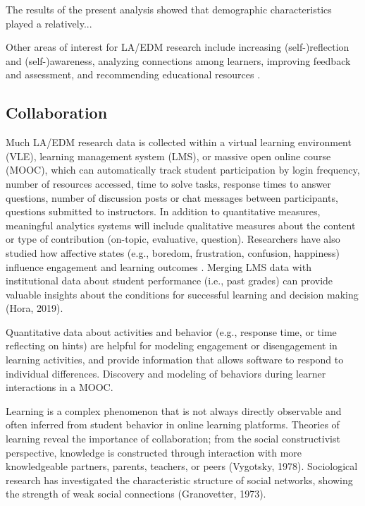 \documentclass[sigconf]{acmart}
\begin{document}
The results of the present analysis showed that demographic 
characteristics played a relatively...  

Other areas of interest for LA/EDM research include 
increasing (self-)reflection and (self-)awareness, analyzing connections among 
learners, improving feedback and assessment, and recommending educational 
resources \cite{lang17, lester19, papamitsiou14}.




\subsection{Collaboration}

Much LA/EDM research data is collected within a virtual learning 
environment (VLE), learning management system (LMS), or massive open online 
course (MOOC), which can automatically track student participation by login 
frequency, number of resources accessed, time to solve tasks, response times 
to answer questions, number of discussion posts or chat messages between 
participants, questions submitted to instructors. In addition to quantitative 
measures, meaningful analytics systems will include qualitative measures about 
the content or type of contribution (on-topic, evaluative, question). 
Researchers have also studied how affective states (e.g., boredom, 
frustration, confusion, happiness) influence engagement and learning outcomes 
\cite{pardos14}. Merging LMS data with institutional data about student 
performance (i.e., past grades) can provide valuable insights about the 
conditions for successful learning and decision making (Hora, 2019). 


Quantitative data about activities and behavior (e.g., response time, or 
time reflecting on hints) are helpful for modeling engagement or disengagement 
in learning activities, and provide information that allows software to respond 
to individual differences. Discovery and modeling of behaviors during learner 
interactions in a MOOC. 


Learning is a complex phenomenon that is not always directly observable and 
often inferred from student behavior in online learning platforms. Theories of 
learning reveal the importance of collaboration; from the social constructivist 
perspective, knowledge is constructed through interaction with more knowledgeable
partners, parents, teachers, or peers (Vygotsky, 1978). Sociological research
has investigated the characteristic structure of social networks, showing the 
strength of weak social connections (Granovetter, 1973). 
\end{document}
